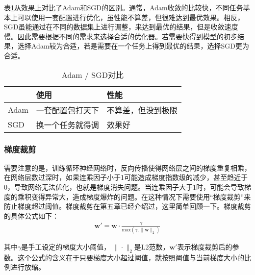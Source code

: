 \parinterval 表\ref{tab:6-8}从效果上对比了Adam和SGD的区别。通常，Adam收敛的比较快，不同任务基本上可以使用一套配置进行优化，虽性能不算差，但很难达到最优效果。相反，SGD虽能通过在不同的数据集上进行调整，来达到最优的结果，但是收敛速度慢。因此需要根据不同的需求来选择合适的优化器。若需要快得到模型的初步结果，选择Adam较为合适，若是需要在一个任务上得到最优的结果，选择SGD更为合适。

\vspace{0.5em}
\begin{table}[htp]
\centering
\caption{ Adam / SGD对比}
\label{tab:6-8}
\begin{tabular}{l | l  l }
	 		&使用		&性能 \\ \hline
\rule{0pt}{15pt}	Adam	&一套配置包打天下	&不算差，但没到极限 \\
\rule{0pt}{15pt}	SGD	&换一个任务就得调	&效果好 \\
\end{tabular}
\end{table}


\vspace{-1.5em}
\subsubsection{梯度裁剪}
\vspace{0.5em}

\parinterval 需要注意的是，训练循环神经网络时，反向传播使得网络层之间的梯度重复相乘，在网络层数过深时，如果连乘因子小于1可能造成梯度指数级的减少，甚至趋近于0，导致网络无法优化，也就是梯度消失问题。当连乘因子大于1时，可能会导致梯度的乘积变得异常大，造成梯度爆炸的问题。在这种情况下需要使用``梯度裁剪''来防止梯度超过阈值。梯度裁剪在第五章已经介绍过，这里简单回顾一下。梯度裁剪的具体公式如下：
\begin{eqnarray}
\mathbf{w}' = \mathbf{w} \cdot \frac{\gamma} {\textrm{max}(\gamma,\| \mathbf{w} \|_2)}
\label{eq:6-33}
\end{eqnarray}
\vspace{0.5em}

\noindent 其中$\gamma$是手工设定的梯度大小阈值， $\| \cdot \|_2$是L2范数，$\mathbf{w}'$表示梯度裁剪后的参数。这个公式的含义在于只要梯度大小超过阈值，就按照阈值与当前梯度大小的比例进行放缩。

